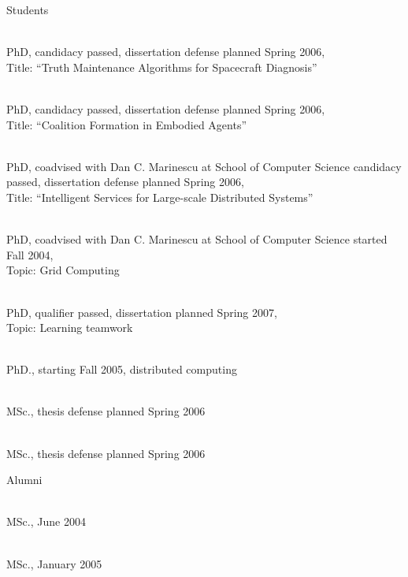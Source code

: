 \begin{category}{Students}

\\
PhD, candidacy passed, dissertation defense planned Spring 2006, \\
Title: ``Truth Maintenance Algorithms for Spacecraft Diagnosis''

 \\
PhD, candidacy passed, dissertation defense planned Spring 2006, \\
Title: ``Coalition Formation in Embodied Agents''

 \\
PhD, coadvised with Dan C. Marinescu at School of Computer Science
candidacy passed, dissertation defense planned Spring 2006, \\
Title: ``Intelligent Services for Large-scale Distributed Systems''

 \\
PhD, coadvised with Dan C. Marinescu at School of Computer Science
started Fall 2004, \\
Topic: Grid Computing

 \\
PhD, qualifier passed, dissertation planned Spring 2007, \\
Topic: Learning
teamwork 

 \\
PhD., starting Fall 2005, distributed computing 

\\
MSc., thesis defense planned Spring 2006 

\\
MSc., thesis defense planned Spring 2006 

\end{category}

\begin{category}{Alumni}
 
\\
MSc., June 2004
 
\\
MSc., January 2005

\end{category}